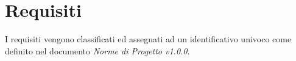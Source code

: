 
\section{Requisiti} 
I requisiti vengono classificati ed assegnati ad un identificativo  univoco come definito nel documento \textit{Norme di Progetto v1.0.0}.
\renewcommand{\arraystretch}{1.5}





